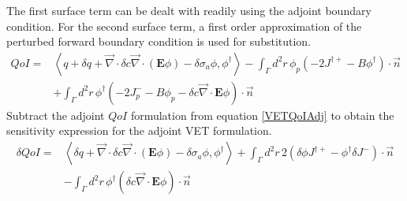\documentclass{article}
\newcommand{\bra}{\left\langle}
\newcommand{\ket}{\right\rangle}
\newcommand{\vdiv}{\vec{\nabla} \cdot}
\newcommand{\Edd}{\mathbf{E}}
\newcommand{\siga}{\sigma_a}
\newcommand{\isigt}{c}
\newcommand{\scalSource}{q}
\newcommand{\qoi}{QoI}
\begin{document}
The first surface term can be dealt with readily using the adjoint boundary condition. For the second surface term, a first order approximation of the perturbed forward boundary condition is used for substitution.
\begin{equation}
\label{QoIVETAdj}
\begin{split}
\qoi =& \bra \scalSource + \delta \scalSource + \vdiv \delta \isigt \vdiv \left( \Edd \phi \right) - \delta \siga \phi, \phi^\dag \ket - \int_\Gamma d^2 r \, \phi_p \left( - 2J^{\dag +} - B \phi^\dag \right) \cdot \vec{n} 
\\ &+ \int_\Gamma d^2 r \, \phi^\dag \left( - 2J_p^- - B \phi_p - \delta \isigt \vdiv \Edd \phi \right) \cdot \vec{n} 
\end{split}
\end{equation}
Subtract the adjoint $\qoi$ formulation from equation \ref{VETQoIAdj} to obtain the sensitivity expression for the adjoint VET formulation.
\begin{equation}
\label{SensVETAdjNoBC}
\begin{split}
\delta \qoi =& \bra \delta \scalSource + \vdiv \delta \isigt \vdiv \left( \Edd \phi \right) - \delta \siga \phi, \phi^\dag \ket + \int_\Gamma d^2 r \, 2  \left( \delta \phi J^{\dag +}  - \phi^\dag \delta J^- \right) \cdot \vec{n}
\\ &- \int_\Gamma d^2 r \,  \phi^\dag \left( \delta \isigt \vdiv \Edd \phi \right) \cdot \vec{n} 
\end{split}
\end{equation}
\end{document}
